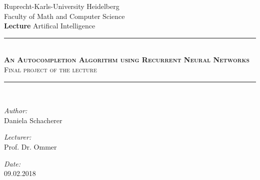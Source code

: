 \documentclass[11pt,a4paper,bibliography=totocnumbered,listof=totocnumbered]{scrartcl}
\begin{document}
\begin{titlepage}

\newcommand{\HRule}{\rule{\linewidth}{0.5mm}} %

\center %

\LARGE Ruprecht-Karls-University Heidelberg \\[0.5cm] %
\Large Faculty of Math and Computer Science \\[1.5cm]
\Large \textbf{Lecture} Artifical Intelligence \\[0.5cm] %

\HRule \\[0.4cm]
{ \textsc{\huge \bfseries An Autocompletion Algorithm using Recurrent Neural Networks}}\\ \textsc{\Large Final project of the lecture }\\[0.4cm] %
\HRule \\[1.5cm]

\begin{minipage}{0.4\textwidth}
\begin{flushleft} \large
\emph{Author:}\\
Daniela Schacherer \\%
\end{flushleft}

\begin{flushleft} \large
\emph{Lecturer:}\\
Prof. Dr. Ommer\\ %
\end{flushleft}

\begin{flushleft} \large
\emph{Date:}\\
09.02.2018 \\%
\end{flushleft}

\end{minipage}
~
\begin{minipage}{0.4\textwidth}
\end{minipage}\\[4cm]

\vfill %

\end{titlepage}

\end{document}
